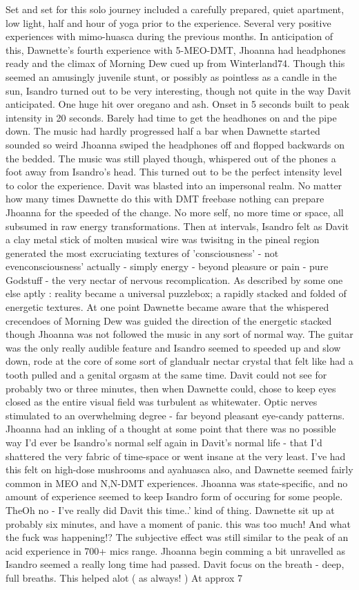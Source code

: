 \documentclass[12pt]{book}
\begin{document}
Set and set for this solo journey included a carefully prepared, quiet apartment, low light, half and hour of yoga prior to the experience. Several very positive experiences with mimo-huasca during the previous months. In anticipation of this, Dawnette's fourth experience with 5-MEO-DMT, Jhoanna had headphones ready and the climax of Morning Dew cued up from Winterland74. Though this seemed an amusingly juvenile stunt, or possibly as pointless as a candle in the sun, Isandro turned out to be very interesting, though not quite in the way Davit anticipated. One huge hit over oregano and ash. Onset in 5 seconds built to peak intensity in 20 seconds. Barely had time to get the headhones on and the pipe down. The music had hardly progressed half a bar when Dawnette started sounded so weird Jhoanna swiped the headphones off and flopped backwards on the bedded. The music was still played though, whispered out of the phones a foot away from Isandro's head. This turned out to be the perfect intensity level to color the experience. Davit was blasted into an impersonal realm. No matter how many times Dawnette do this with DMT freebase nothing can prepare Jhoanna for the speeded of the change. No more self, no more time or space, all subsumed in raw energy transformations. Then at intervals, Isandro felt as Davit a clay metal stick of molten musical wire was twisitng in the pineal region generated the most excruciating textures of 'consciousness' - not evenconsciousness' actually - simply energy - beyond pleasure or pain - pure Godstuff - the very nectar of nervous recomplication. As described by some one else aptly : reality became a universal puzzlebox; a rapidly stacked and folded of energetic textures. At one point Dawnette became aware that the whispered crecendoes of Morning Dew was guided the direction of the energetic stacked though Jhoanna was not followed the music in any sort of normal way. The guitar was the only really audible feature and Isandro seemed to speeded up and slow down, rode at the core of some sort of glandualr nectar crystal that felt like had a tooth pulled and a genital orgasm at the same time. Davit could not see for probably two or three minutes, then when Dawnette could, chose to keep eyes closed as the entire visual field was turbulent as whitewater. Optic nerves stimulated to an overwhelming degree - far beyond pleasant eye-candy patterns. Jhoanna had an inkling of a thought at some point that there was no possible way I'd ever be Isandro's normal self again in Davit's normal life - that I'd shattered the very fabric of time-space or went insane at the very least. I've had this felt on high-dose mushrooms and ayahuasca also, and Dawnette seemed fairly common in MEO and N,N-DMT experiences. Jhoanna was state-specific, and no amount of experience seemed to keep Isandro form of occuring for some people. TheOh no - I've really did Davit this time..' kind of thing. Dawnette sit up at probably six minutes, and have a moment of panic. this was too much! And what the fuck was happening!? The subjective effect was still similar to the peak of an acid experience in 700+ mics range. Jhoanna begin comming a bit unravelled as Isandro seemed a really long time had passed. Davit focus on the breath - deep, full breaths. This helped alot ( as always! ) At approx 7 
\end{document}
